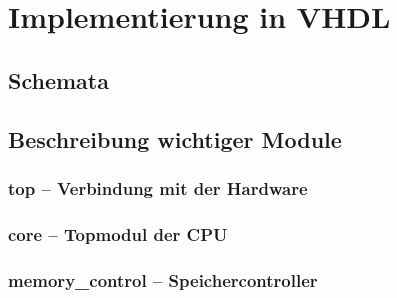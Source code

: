 \chapter{Implementierung in VHDL}
\label{c:implementierunginvhdl}
\section{Schemata}
\pagebreak
\section{Beschreibung wichtiger Module}
\subsection{top -- Verbindung mit der Hardware}
\pagebreak
\subsection{core -- Topmodul der CPU}
\pagebreak
\subsection{memory\_control -- Speichercontroller}
\pagebreak
